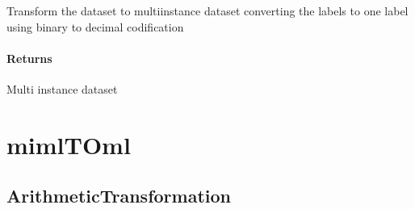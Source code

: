 \documentclass[letterpaper,10pt,english]{sphinxmanual}
\begin{document}
\begin{fulllineitems}
\begin{fulllineitems}
\label{\detokenize{transformation/mimlTOmi/_autosummary/miml.transformation.mimlTOmi.label_powerset_transformation.LabelPowersetTransformation:miml.transformation.mimlTOmi.label_powerset_transformation.LabelPowersetTransformation.transform_dataset}}
\pysigstartsignatures
{}
\pysigstopsignatures
\sphinxAtStartPar
Transform the dataset to multi\sphinxhyphen{}instance dataset converting the labels to one label using binary to decimal
codification


\paragraph{Returns}
\label{\detokenize{transformation/mimlTOmi/_autosummary/miml.transformation.mimlTOmi.label_powerset_transformation.LabelPowersetTransformation:id5}}\begin{description}
\sphinxAtStartPar
Multi instance dataset

\end{description}

\end{fulllineitems}


\end{fulllineitems}


\sphinxstepscope


\section{mimlTOml}
\label{\detokenize{transformation/mimlTOml/index:mimltoml}}\label{\detokenize{transformation/mimlTOml/index::doc}}
\sphinxstepscope


\subsection{ArithmeticTransformation}
\label{\detokenize{transformation/mimlTOml/arithmetic:arithmetictransformation}}\label{\detokenize{transformation/mimlTOml/arithmetic::doc}}
\end{document}
